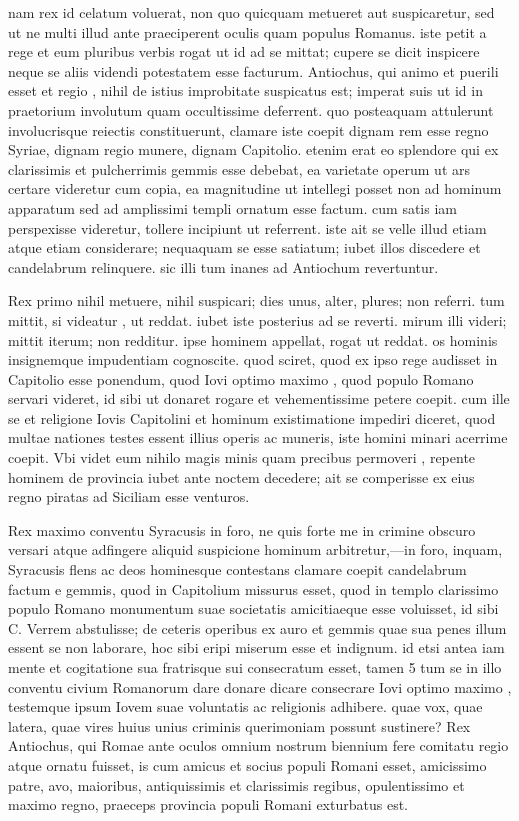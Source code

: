  nam rex id celatum voluerat, non quo quicquam metueret aut suspicaretur, sed ut ne multi illud ante praeciperent oculis quam populus Romanus. iste petit a rege et eum pluribus verbis rogat ut id ad se mittat; cupere se dicit inspicere neque se aliis videndi potestatem esse facturum. Antiochus, qui animo et puerili esset et regio , nihil de istius improbitate suspicatus est; imperat suis ut id in praetorium involutum quam occultissime deferrent. quo posteaquam attulerunt involucrisque reiectis constituerunt, clamare iste coepit dignam rem esse regno Syriae, dignam regio munere, dignam Capitolio. etenim erat eo splendore qui ex clarissimis et pulcherrimis gemmis esse debebat, ea varietate operum ut ars certare videretur cum copia, ea magnitudine ut intellegi posset non ad hominum apparatum sed ad amplissimi templi ornatum esse factum. cum satis iam perspexisse videretur, tollere incipiunt ut referrent. iste ait se velle illud etiam atque etiam considerare; nequaquam se esse satiatum; iubet illos discedere et candelabrum relinquere. sic illi tum inanes ad Antiochum revertuntur.

 Rex primo nihil metuere, nihil suspicari; dies unus, alter, plures; non referri. tum mittit, si videatur , ut reddat. iubet iste posterius ad se reverti. mirum illi videri; mittit iterum; non redditur. ipse hominem appellat, rogat ut reddat. os hominis insignemque impudentiam cognoscite. quod sciret, quod ex ipso rege audisset in Capitolio esse ponendum, quod Iovi optimo maximo , quod populo Romano servari videret, id sibi ut donaret rogare et vehementissime petere coepit. cum ille se et religione Iovis Capitolini et hominum existimatione impediri diceret, quod multae nationes testes essent illius operis ac muneris, iste homini minari acerrime coepit. Vbi videt eum nihilo magis minis quam precibus permoveri , repente hominem de provincia iubet ante noctem decedere; ait se comperisse ex eius regno piratas ad Siciliam esse venturos.

 Rex maximo conventu Syracusis in foro, ne quis forte me in crimine obscuro versari atque adfingere aliquid suspicione hominum arbitretur,—in foro, inquam, Syracusis flens ac deos hominesque contestans clamare coepit candelabrum factum e gemmis, quod in Capitolium missurus esset, quod in templo clarissimo populo Romano monumentum suae societatis amicitiaeque esse voluisset, id sibi C. Verrem abstulisse; de ceteris operibus ex auro et gemmis quae sua penes illum essent se non laborare, hoc sibi eripi miserum esse et indignum. id etsi antea iam mente et cogitatione sua fratrisque sui consecratum esset, tamen 5 tum se in illo conventu civium Romanorum dare donare dicare consecrare Iovi optimo maximo , testemque ipsum Iovem suae voluntatis ac religionis adhibere. quae vox, quae latera, quae vires huius unius criminis querimoniam possunt sustinere? Rex Antiochus, qui Romae ante oculos omnium nostrum biennium fere comitatu regio atque ornatu fuisset, is cum amicus et socius populi Romani esset, amicissimo patre, avo, maioribus, antiquissimis et clarissimis regibus, opulentissimo et maximo regno, praeceps provincia populi Romani exturbatus est.

